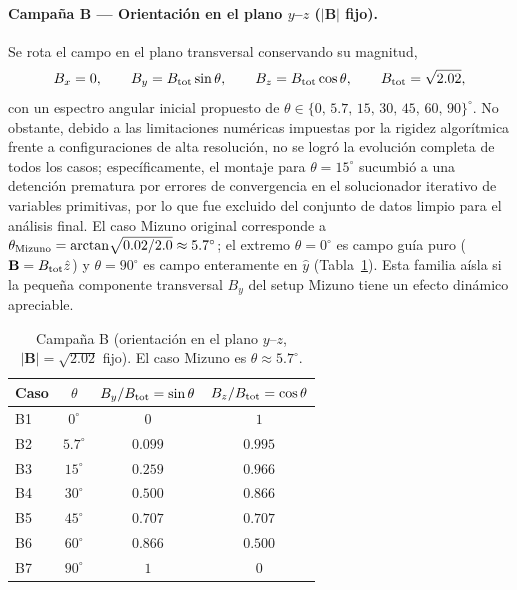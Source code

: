 \paragraph{Campaña B — Orientación en el plano $y$--$z$ ($|\mathbf B|$ fijo).} Se rota el campo en el plano transversal conservando su magnitud,
\begin{equation}
B_x=0,\qquad B_y=B_{\rm tot}\sin\theta,\qquad B_z=B_{\rm tot}\cos\theta,\qquad B_{\rm tot}=\sqrt{2.02},
\end{equation}
con un espectro angular inicial propuesto de $\theta\in\{0,\,5.7,\,15,\,30,\,45,\,60,\,90\}^\circ$. No obstante, debido a las limitaciones numéricas impuestas por la rigidez algorítmica frente a configuraciones de alta resolución, no se logró la evolución completa de todos los casos; específicamente, el montaje para $\theta=15^\circ$ sucumbió a una detención prematura por errores de convergencia en el solucionador iterativo de variables primitivas, por lo que fue excluido del conjunto de datos limpio para el análisis final. El caso Mizuno original corresponde a $\theta_{\rm Mizuno}=\arctan\!\sqrt{0.02/2.0}\approx5.7^\circ$; el extremo $\theta=0^\circ$ es campo guía puro ($\mathbf B=B_{\rm tot}\hat z$) y $\theta=90^\circ$ es campo enteramente en $\hat y$ (Tabla~\ref{tab:campana_B}). Esta familia aísla si la pequeña componente transversal $B_y$ del setup Mizuno tiene un efecto dinámico apreciable.

\begin{table}[H]\centering
\caption{Campaña B (orientación en el plano $y$--$z$, $|\mathbf B|=\sqrt{2.02}$ fijo). El caso Mizuno es $\theta\approx5.7^\circ$.}
\label{tab:campana_B}
\begin{tabular}{lccc}
\hline
Caso & $\theta$ & $B_y/B_{\rm tot}=\sin\theta$ & $B_z/B_{\rm tot}=\cos\theta$ \\
\hline
B1 & $0^\circ$    & $0$     & $1$     \\
B2 & $5.7^\circ$  & $0.099$ & $0.995$ \\
B3 & $15^\circ$   & $0.259$ & $0.966$ \\
B4 & $30^\circ$   & $0.500$ & $0.866$ \\
B5 & $45^\circ$   & $0.707$ & $0.707$ \\
B6 & $60^\circ$   & $0.866$ & $0.500$ \\
B7 & $90^\circ$   & $1$     & $0$     \\
\hline
\end{tabular}
\end{table}


